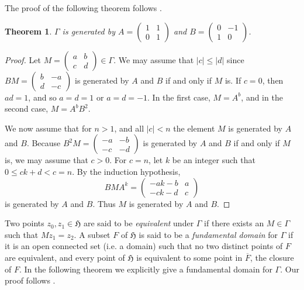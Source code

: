 \documentclass{article}
\newtheorem{theorem}{Theorem}
\begin{document}
The proof of the following theorem follows \cite[Chapter I, 5.7]{MR808396}.

\begin{theorem}
\label{theorem:generate}
$\Gamma$ is generated by
$A=\begin{pmatrix}1&1\\0&1\end{pmatrix}$ and
$B=\begin{pmatrix}0&-1\\1&0\end{pmatrix}$. 
\end{theorem}
\begin{proof}
Let $M=\begin{pmatrix}a&b\\c&d\end{pmatrix} \in \Gamma$.
We may assume that $|c| \leq |d|$ since $BM=\begin{pmatrix}b&-a\\d&-c\end{pmatrix}$ is
generated by $A$ and $B$ if and only if $M$ is. If $c=0$, then $ad=1$, and so $a=d=1$ or $a=d=-1$. In the first case, $M=A^b$, and in the second case, $M=A^b B^2$.

We now assume that for $n>1$, and all $|c|<n$ the element $M$ is generated by $A$ and $B$. Because $B^2 M=\begin{pmatrix}-a&-b\\-c&-d\end{pmatrix}$ is generated by $A$ and $B$ if and only if $M$ is, we may assume that $c>0$. For $c=n$, let $k$ be an integer
such that $0 \leq ck+d<c=n$. By the induction hypothesis,
\[
BMA^k=\begin{pmatrix}-ak-b&a\\-ck-d&c\end{pmatrix}
\]
is generated by $A$ and $B$. Thus $M$ is generated by $A$ and $B$.
\end{proof}

Two points $z_0,z_1 \in \mathfrak{H}$ are said to be {\em equivalent} under $\Gamma$ if there exists an $M \in \Gamma$ such that $Mz_1=z_2$.
A subset $F$ of $\mathfrak{H}$ is said to be a {\em fundamental domain} for $\Gamma$ if it is an open connected set (i.e. a domain) such that no two distinct points of $F$ are equivalent, and every point of $\mathfrak{H}$ is equivalent to some point in $\overline{F}$, the closure of $F$. In the following theorem we explicitly give a fundamental domain for $\Gamma$.
Our proof follows
\cite[Chapter VII, Theorem 1]{MR0344216}.
\end{document}
